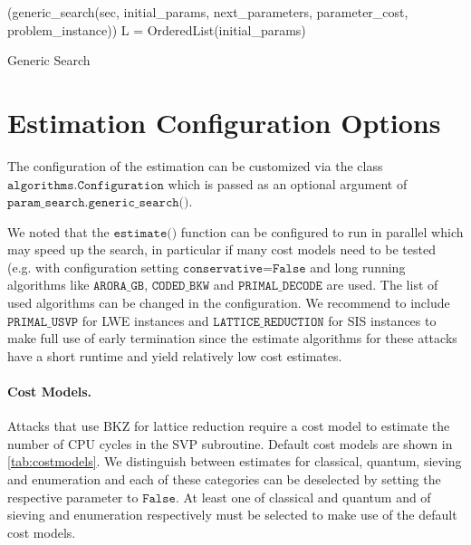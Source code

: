 \begin{algorithm2e} %
    \Begin(generic\_search(sec, initial\_params, next\_parameters, parameter\_cost,  problem\_instance)) %
    {
        L = OrderedList(initial\_params)\\
    }
    \caption{Generic Search} \label{alg:generic-search}
\end{algorithm2e}


\section{Estimation Configuration Options}\label{sec:config-options}
The configuration of the estimation can be customized via the class $\texttt{algorithms.Configuration}$ which is passed as an optional argument of $\texttt{param\_search.generic\_search()}$.

We noted that the $\texttt{estimate()}$ function can be configured to run in parallel which may speed up the search, in particular if many cost models need to be tested (e.g. with configuration setting $\texttt{conservative=False}$ and long running algorithms like $\texttt{ARORA\_GB}$, $\texttt{CODED\_BKW}$ and $\texttt{PRIMAL\_DECODE}$ are used. The list of used algorithms can be changed in the configuration. We recommend to include $\texttt{PRIMAL\_USVP}$ for LWE instances and $\texttt{LATTICE\_REDUCTION}$ for SIS instances to make full use of early termination since the estimate algorithms for these attacks have a short runtime and yield relatively low cost estimates.

\paragraph{Cost Models.} \label{sec:tool-costmodels} Attacks that use BKZ for lattice reduction require a cost model to estimate the number of CPU cycles in the SVP subroutine. Default cost models are shown in \cref{tab:costmodels}. We distinguish between estimates for classical, quantum, sieving and enumeration and each of these categories can be deselected by setting the respective parameter to $\texttt{False}$. At least one of classical and quantum and of sieving and enumeration respectively must be selected to make use of the default cost models.

